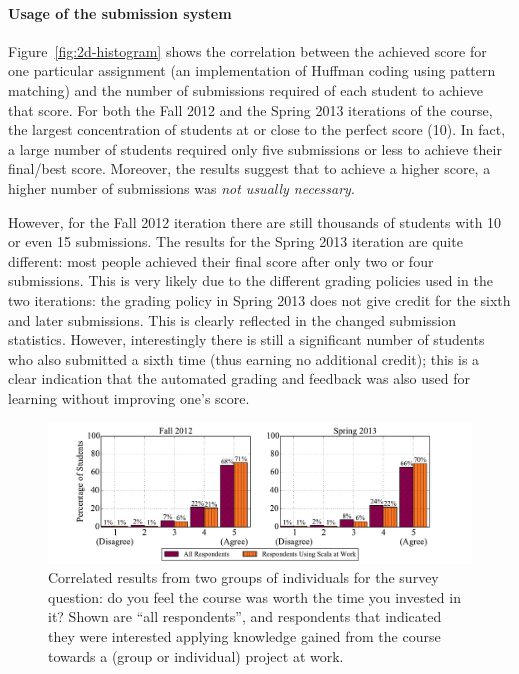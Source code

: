 \documentclass{sig-alternate}
\begin{document}
\paragraph{Usage of the submission system}

Figure~\ref{fig:2d-histogram} shows the correlation between the achieved
score for one particular assignment (an implementation of Huffman coding using
pattern matching) and the number of submissions required of each student to achieve that
score. For both the Fall 2012 and the Spring 2013 iterations of the course,
the largest concentration of students at or close to the perfect score
(10). In fact, a large number of students required only five submissions or less to
achieve their final/best score. Moreover, the results suggest that to achieve
a higher score, a higher number of submissions was {\em not usually necessary}.

However, for the Fall 2012 iteration there are still thousands of students
with 10 or even 15 submissions. The results for the Spring 2013 iteration are
quite different: most people achieved their final score after only two or four
submissions. This is very likely due to the different grading policies used in
the two iterations: the grading policy in Spring 2013 does not give credit for
the sixth and later submissions. This is clearly reflected in the changed
submission statistics. However, interestingly there is still a significant
number of students who also submitted a sixth time (thus earning no additional
credit); this is a clear indication that the automated grading and feedback
was also used for learning without improving one's score.

\begin{figure}[ht!]
  \centering
  \includegraphics[width=\textwidth]{plots/worth-it-apply-it.pdf}
  \caption{Correlated results from two groups of individuals for the survey question: do you feel the course was worth the time you invested in it? Shown are ``all respondents'', and respondents that indicated they were interested applying knowledge gained from the course towards a (group or individual) project at work.}
  \label{fig:worth-it-apply-it}
\end{figure}
\end{document}
